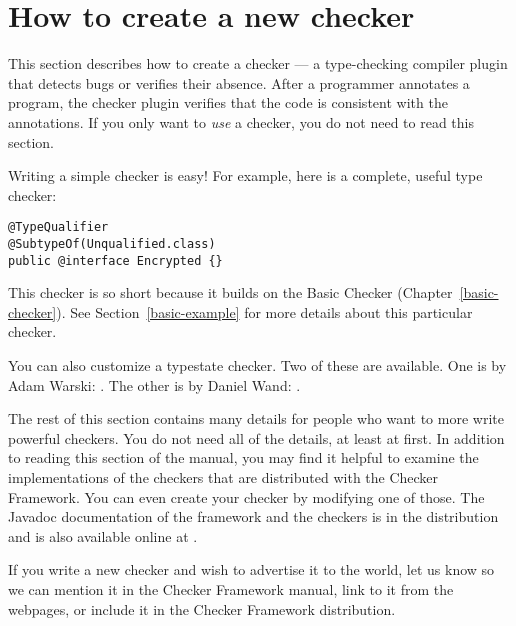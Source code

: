 \htmlhr
\chapter{How to create a new checker\label{writing-a-checker}}

\newcommand{\TreeAPIBase}{http://download.java.net/jdk7/docs/jdk/api/javac/tree/com/sun/source}
\newcommand{\refTreeclass}[2]{\ahref{\TreeAPIBase{}/#1/#2.html?is-external=true}{\<#2>}}
\newcommand{\ModelAPIBase}{http://download.java.net/jdk7/docs/api/javax/lang/model}
\newcommand{\refModelclass}[2]{\ahref{\ModelAPIBase{}/#1/#2.html?is-external=true}{\<#2>}}

This section describes how to create a checker
--- a type-checking compiler plugin that detects bugs or verifies their
absence.  After a programmer annotates a program,
the checker plugin verifies that the code is consistent
with the annotations.
If you only want to \emph{use} a checker, you do not need to read this
section.

Writing a simple checker is easy!  For example, here is a complete, useful
type checker:

\begin{Verbatim}
@TypeQualifier
@SubtypeOf(Unqualified.class)
public @interface Encrypted {}
\end{Verbatim}

This checker is so short because it builds on the Basic Checker
(Chapter~\ref{basic-checker}).
See Section~\ref{basic-example} for more details about this particular checker.

You can also customize a typestate checker.
Two of these are available.  One is by Adam Warski:  
.
The other is by Daniel Wand:
.


The rest of this section contains many details for people who want to more write powerful
checkers.
You do not need all of the details, at least at first.
In addition to reading this section of the manual, you may find it helpful
to examine the implementations of the checkers that are distributed with
the Checker Framework.  You can even create your checker by modifying one
of those.
The Javadoc documentation of the framework and the checkers is in the
distribution and is also available online at
.

If you write a new checker and wish to advertise it to the world, let us
know so we can mention it in the Checker Framework manual, link to
it from the webpages, or include it in the Checker Framework distribution.



